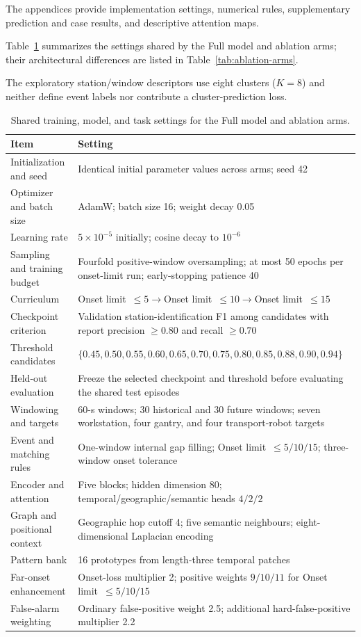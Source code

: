 \documentclass[a4paper,fleqn]{cas-dc}
\begin{document}
The appendices provide implementation settings, numerical rules, supplementary prediction and case results, and descriptive attention maps.

Table~\ref{tab:shared-training-protocol} summarizes the settings shared by the Full model and ablation arms; their architectural differences are listed in Table~\ref{tab:ablation-arms}.

The exploratory station/window descriptors use eight clusters ($K=8$) and neither define event labels nor contribute a cluster-prediction loss.

\begin{table}[pos=!tp]
\centering
\caption{Shared training, model, and task settings for the Full model and ablation arms.}
\label{tab:shared-training-protocol}
\footnotesize
\setlength{\tabcolsep}{6pt}
\renewcommand{\arraystretch}{1.05}
\begin{tabularx}{\textwidth}{@{}lX@{}}
\toprule
Item & Setting \\
\midrule
Initialization and seed & Identical initial parameter values across arms; seed 42 \\
Optimizer and batch size & AdamW; batch size 16; weight decay 0.05 \\
Learning rate & $5\times10^{-5}$ initially; cosine decay to $10^{-6}$ \\
Sampling and training budget & Fourfold positive-window oversampling; at most 50 epochs per onset-limit run; early-stopping patience 40 \\
Curriculum & Onset limit~$\leq5\rightarrow$Onset limit~$\leq10\rightarrow$Onset limit~$\leq15$ \\
Checkpoint criterion & Validation station-identification F1 among candidates with report precision $\geq0.80$ and recall $\geq0.70$ \\
Threshold candidates & $\{0.45,0.50,0.55,0.60,0.65,0.70,0.75,0.80,0.85,0.88,0.90,0.94\}$ \\
Held-out evaluation & Freeze the selected checkpoint and threshold before evaluating the shared test episodes \\
Windowing and targets & 60-s windows; 30 historical and 30 future windows; seven workstation, four gantry, and four transport-robot targets \\
Event and matching rules & One-window internal gap filling; Onset limit~$\leq5/10/15$; three-window onset tolerance \\
Encoder and attention & Five blocks; hidden dimension 80; temporal/geographic/semantic heads $4/2/2$ \\
Graph and positional context & Geographic hop cutoff 4; five semantic neighbours; eight-dimensional Laplacian encoding \\
Pattern bank & 16 prototypes from length-three temporal patches \\
Far-onset enhancement & Onset-loss multiplier 2; positive weights $9/10/11$ for Onset limit~$\leq5/10/15$ \\
False-alarm weighting & Ordinary false-positive weight 2.5; additional hard-false-positive multiplier 2.2 \\
\bottomrule
\end{tabularx}
\end{table}
\end{document}
